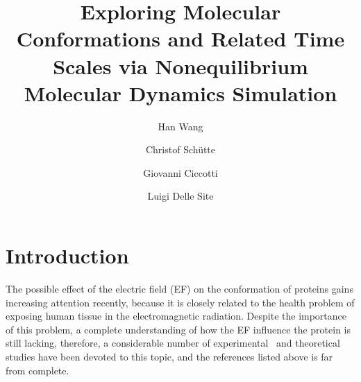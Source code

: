 \documentclass[aip,jcp,a4paper,preprint,onecolumn]{revtex4-1}
\begin{document}
\title{Exploring Molecular Conformations and Related Time Scales via Nonequilibrium Molecular Dynamics Simulation}
\author{Han Wang}
\author{Christof Sch\"utte}
\author{Giovanni Ciccotti}
\author{Luigi Delle Site}

\begin{abstract}
\end{abstract}

\maketitle


\section{Introduction}


The possible effect of the electric field (EF) on the conformation of
proteins gains increasing attention recently, because it is closely
related to the health problem of exposing human tissue in the
electromagnetic radiation. Despite the importance of this problem, a
complete understanding of how the EF influence the  protein
is still lacking, therefore, a considerable number of
experimental~\cite{bohr2000microwave, bohr2000microwave-1,
  dePomerai2000cell, inskip2001cellular, mancinelli2004non} and
theoretical~\cite{budi2005electric, budi2007effect,
  budi2008comparative, toschi2008effects, astrakas2011electric,
  astrakas2012structural, damm2012can, starzyk2013proteins,
  english2009nonequilibrium, solomentsev2012effects} studies have been devoted to this topic,
and the references listed above is far from complete.
\end{document}

